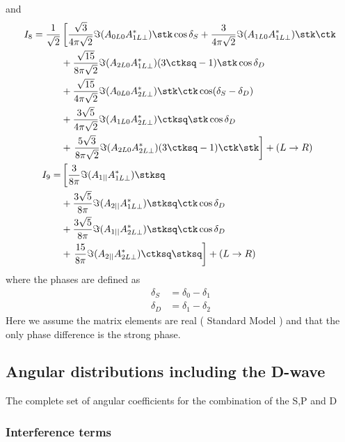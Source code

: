 and
\begin{align}
I_8 = \frac{1}{\sqrt{2}} &  \left[  \frac{\sqrt{3}}{4\pi\sqrt{2}} \Im( A_{0L0} A_{1L\bot}^{*} )\stk\cos\delta_S + \frac{3}{4\pi\sqrt{2}} \Im( A_{1L0} A_{1L\bot}^{*} ) \stk \ctk   \right. \nonumber \\
    & + \frac{\sqrt{15}}{8\pi\sqrt{2}} \Im( A_{2L0} A_{1L\bot}^{*} ) (3\ctksq-1) \stk \cos\delta_D \nonumber \\
    & + \frac{\sqrt{15}}{4\pi\sqrt{2}} \Im( A_{0L0} A_{2L\bot}^{*} )\stk\ctk \cos(\delta_S-\delta_D) \nonumber \\
    & + \frac{3\sqrt{5}}{4\pi\sqrt{2}} \Im( A_{1L0} A_{2L\bot}^{*} ) \ctksq\stk \cos\delta_D \nonumber \\ 
    & + \left. \frac{5\sqrt{3}}{8\pi\sqrt{2}} \Im( A_{2L0} A_{2L\bot}^{*} )(3\ctksq-1)\ctk\stk \right] + ( L\to R)\\
I_9 =  &  \left[  \frac{3}{8\pi} \Im( A_{1||} A_{1L\bot}^{*} ) \stksq    \right. \nonumber \\
    & + \frac{3\sqrt{5}}{8\pi} \Im( A_{2||} A_{1L\bot}^{*} ) \stksq \ctk \cos\delta_D \nonumber \\
    & + \frac{3\sqrt{5}}{8\pi} \Im( A_{1||} A_{2L\bot}^{*} ) \stksq \ctk \cos\delta_D \nonumber \\ 
    & + \left. \frac{15}{8\pi} \Im( A_{2||} A_{2L\bot}^{*} )\ctksq\stksq  \right] + ( L\to R)
\end{align}
where the phases are defined as 
\begin{subequations}\begin{align}
 \delta_S &= \delta_0 - \delta_1 \\
 \delta_D &= \delta_1 - \delta_2
\end{align}\end{subequations}
Here we assume the matrix elements are real ( Standard Model ) and that the only phase difference is the strong phase.



\subsection{ Angular distributions including the D-wave }

The complete set of angular coefficients for the combination of the S,P and D


\subsubsection{Interference terms}

